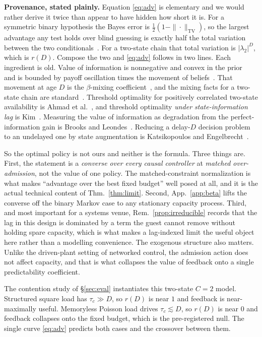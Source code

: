 \noindent\textbf{Provenance, stated plainly.}
Equation \eqref{eq:adv} is elementary and we would rather derive it twice than
appear to have hidden how short it is. For a symmetric binary hypothesis the Bayes
error is $\tfrac12(1-\|\cdot\|_{\mathrm{TV}})$, so the largest advantage any test
holds over blind guessing is exactly half the total variation between the two
conditionals~\cite{tsybakov}. For a two-state chain that total variation is
$|\lambda_2|^{D}$, which is $r(D)$. Compose the two and \eqref{eq:adv} follows in
two lines. Each ingredient is old. Value of information is nonnegative and convex
in the prior~\cite{howard1966} and is bounded by payoff oscillation times the
movement of beliefs~\cite{delaragossner}. That movement at age $D$ is the
$\beta$-mixing coefficient~\cite{bradley2005}, and the mixing facts for a
two-state chain are standard~\cite{lpw}. Threshold optimality for positively
correlated two-state availability is Ahmad et al.~\cite{myopicaccess}, and
threshold optimality \emph{under state-information lag} is Kim~\cite{kim1985}.
Measuring the value of information as degradation from the perfect-information
gain is Brooks and Leondes~\cite{brooks1972}. Reducing a delay-$D$ decision
problem to an undelayed one by state augmentation is Katsikopoulos and
Engelbrecht~\cite{katsikopoulos}.

So the optimal policy is not ours and neither is the formula. Three things are.
First, the statement is a \emph{converse over every causal controller} at
\emph{matched over-admission}, not the value of one policy. The matched-constraint
normalization is what makes ``advantage over the best fixed budget'' well posed at
all, and it is the actual technical content of Thm.~\ref{thm:limit}. Second,
App.~\ref{app:beta} lifts the converse off the binary Markov case to any
stationary capacity process. Third, and most important for a systems venue,
Rem.~\ref{prop:irreducible} records that the lag in this design is dominated by a
term the guest cannot remove without holding spare capacity, which is what makes a
lag-indexed limit the useful object here rather than a modelling convenience. The exogenous structure also matters. Unlike the
driven-plant setting of networked control, the admission action does not affect
capacity, and that is what collapses the value of feedback onto a single
predictability coefficient.

\begin{corollary}
\label{cor:exp}
The contention study of \S\ref{sec:eval} instantiates this two-state $C{=}2$
model. Structured square load has $\tau_c\gg D$, so $r(D)$ is near $1$ and
feedback is near-maximally useful. Memoryless Poisson load drives
$\tau_c\lesssim D$, so $r(D)$ is near $0$ and feedback collapses onto the fixed
budget, which is the pre-registered null. The single curve \eqref{eq:adv} predicts
both cases and the crossover between them.
\end{corollary}

